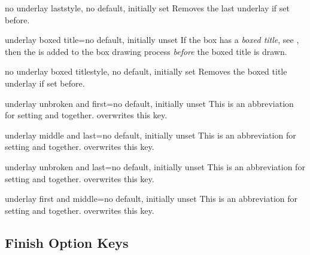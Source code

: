 \begin{docTcbKey}{no underlay last}{}{style, no default, initially set}
  Removes the last underlay if set before.
\end{docTcbKey}

\begin{docTcbKey}{underlay boxed title}{=}{no default, initially unset}
  If the box has a \emph{boxed title}, see ,
  then the  is added to the box drawing process
  \emph{before} the boxed title is drawn.
\end{docTcbKey}

\begin{docTcbKey}{no underlay boxed title}{}{style, no default, initially set}
  Removes the boxed title underlay if set before.
\end{docTcbKey}

\begin{docTcbKey}{underlay unbroken and first}{=}{no default, initially unset}
  This is an abbreviation for setting
   and
   together.
   overwrites this key.
\end{docTcbKey}

\begin{docTcbKey}{underlay middle and last}{=}{no default, initially unset}
  This is an abbreviation for setting
   and
   together.
   overwrites this key.
\end{docTcbKey}

\begin{docTcbKey}{underlay unbroken and last}{=}{no default, initially unset}
  This is an abbreviation for setting
   and
   together.
   overwrites this key.
\end{docTcbKey}

\begin{docTcbKey}[][doc new=2014-09-19]{underlay first and middle}{=}{no default, initially unset}
  This is an abbreviation for setting
   and
   together.
   overwrites this key.
\end{docTcbKey}


\clearpage
\subsection{Finish Option Keys}\label{subsec:skinfinish}

